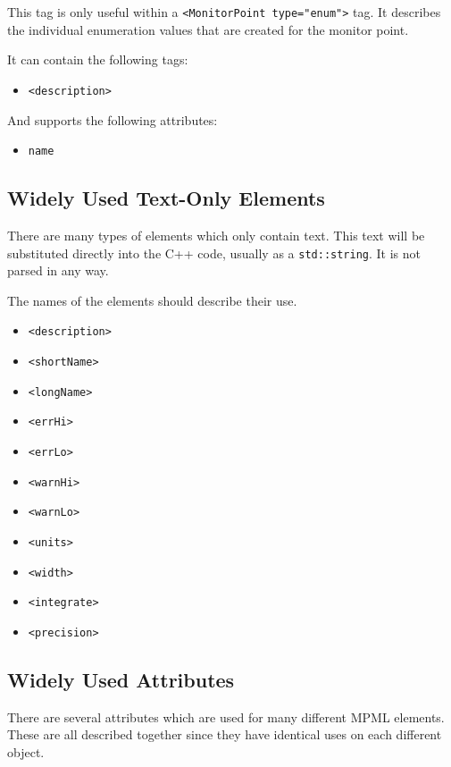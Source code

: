 \documentclass[letterpaper,12pt,oneside,pdftex]{article}
\newcommand{\mpml}[1]{\texttt{<#1>}}
\newcommand{\attr}[1]{\texttt{#1}}
\newenvironment{pitemize}{
\begin{itemize}
  \setlength{\itemsep}{1pt}
  \setlength{\parskip}{0pt}
  \setlength{\parsep}{0pt}
}{\end{itemize}}
\begin{document}
This tag is only useful within a \mpml{MonitorPoint type="enum"} tag. It
describes the individual enumeration values that are created for the monitor
point.

It can contain the following tags:

\begin{pitemize}
\item \mpml{description}
\end{pitemize}

And supports the following attributes:

\begin{pitemize}
\item \attr{name}
\end{pitemize}

\subsection{Widely Used Text-Only Elements}

There are many types of elements which only contain text. This text will be
substituted directly into the C++ code, usually as a \texttt{std::string}. It is
not parsed in any way.

The names of the elements should describe their use.

\begin{pitemize}
\item \mpml{description}
\item \mpml{shortName}
\item \mpml{longName}
\item \mpml{errHi}
\item \mpml{errLo}
\item \mpml{warnHi}
\item \mpml{warnLo}
\item \mpml{units}
\item \mpml{width}
\item \mpml{integrate}
\item \mpml{precision}
\end{pitemize}

\subsection{Widely Used Attributes}

There are several attributes which are used for many different MPML elements.
These are all described together since they have identical uses on each
different object.
\end{document}
